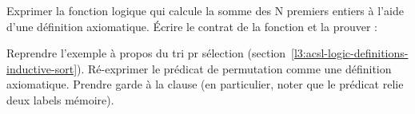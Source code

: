 



Exprimer la fonction logique qui calcule la somme des N premiers entiers à l'aide
d'une définition axiomatique. Écrire le contrat de la fonction 
et la prouver :






Reprendre l'exemple à propos du tri pr sélection
(section~\ref{l3:acsl-logic-definitions-inductive-sort}). Ré-exprimer le
prédicat de permutation comme une définition axiomatique. Prendre garde à la
clause  (en particulier, noter que le prédicat relie deux
labels mémoire).


